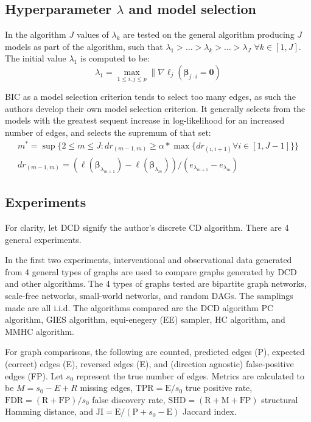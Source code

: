 \documentclass[twoside,11pt]{article}
\begin{document}
\subsection{Hyperparameter $\lambda$ and model selection}

In the algorithm $J$ values of $\lambda_k$ are tested on the general algorithm producing $J$ models as part of the algorithm, such that $\lambda_1 > \dots > \lambda_k > \dots > \lambda_J$ $\forall k \in [1,J]$. The initial value $\lambda_1$ is computed to be:
\begin{equation*}
    \lambda_1 = \max_{1\leq i,j\leq p}\lVert\nabla\ell_j(\bm\beta_{j\cdot i}=\bm 0)
\end{equation*}

BIC as a model selection criterion tends to select too many edges, as such the authors develop their own model selection criterion. It generally selects from the models with the greatest sequent increase in log-likelihood for an increased number of edges, and selects the supremum of that set:
\begin{align}
    m^\ast = \sup \{ 2 \leq m \leq J : dr_{(m-1,m)}\geq \alpha*\max\{dr_{(i,i+1)}\forall{i\in[1,J-1]}\}\}\label{eq:2.20}\\
    dr_{(m-1,m)}=(\ell(\bm\beta_{\lambda_{m+1}})-\ell(\bm\beta_{\lambda_{m}}))/(e_{\lambda_{m+1}}-e_{\lambda_{m}})\nonumber
\end{align}

\subsection{Experiments}

For clarity, let DCD signify the author's discrete CD algorithm. There are 4 general experiments.

In the first two experiments, interventional and observational data generated from 4 general types of graphs are used to compare graphs generated by DCD and other algorithms. The 4 types of graphs tested are bipartite graph networks, scale-free networks, small-world networks, and random DAGs. The samplings made are all i.i.d. The algorithms compared are the DCD algorithm PC algorithm, GIES algorithm, equi-enegery (EE) sampler, HC algorithm, and MMHC algorithm.

For graph comparisons, the following are counted, predicted edges (P), expected (correct) edges (E), reversed edges (E), and (direction agnostic) false-positive edges (FP). Let $s_0$ represent the true number of edges. Metrics are calculated to be $M=s_0-E+R$ missing edges, $\text{TPR}=\text{E}/s_0$ true positive rate, $\text{FDR}=(\text{R}+\text{FP})/s_0$ false discovery rate, $\text{SHD}=(\text{R}+\text{M}+\text{FP})$ structural Hamming distance, and $\text{JI}=\text{E}/(\text{P}+s_0-\text{E})$ Jaccard index.
\end{document}
